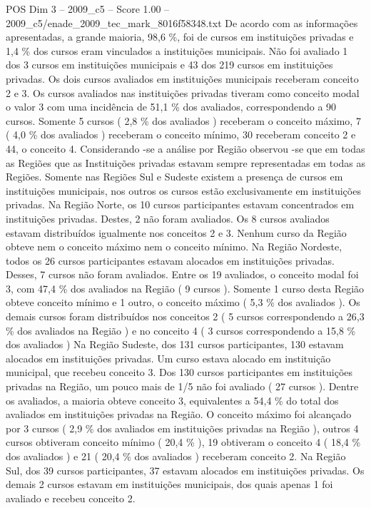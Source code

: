 \begin{textsample}{POS Dim 3 – 2009\_c5 – Score 1.00 – 2009\_c5/enade\_2009\_tec\_mark\_8016f58348.txt}
De acordo com as informações apresentadas, a grande maioria, 98,6 \%, foi de cursos em instituições privadas e 1,4 \% dos cursos eram vinculados a instituições municipais.
Não foi avaliado 1 dos 3 cursos em instituições municipais e 43 dos 219 cursos em instituições privadas.
Os dois cursos avaliados em instituições municipais receberam conceito 2 e 3.
Os cursos avaliados nas instituições privadas tiveram como conceito modal o valor 3 com uma incidência de 51,1 \% dos avaliados, correspondendo a 90 cursos.
Somente 5 cursos ( 2,8 \% dos avaliados ) receberam o conceito máximo, 7 ( 4,0 \% dos avaliados ) receberam o conceito mínimo, 30 receberam conceito 2 e 44, o conceito 4.
Considerando -se a análise por Região observou -se que em todas as Regiões que as Instituições privadas estavam sempre representadas em todas as Regiões.
Somente nas Regiões Sul e Sudeste existem a presença de cursos em instituições municipais, nos outros os cursos estão exclusivamente em instituições privadas.
Na Região Norte, os 10 cursos participantes estavam concentrados em instituições privadas.
Destes, 2 não foram avaliados.
Os 8 cursos avaliados estavam distribuídos igualmente nos conceitos 2 e 3.
Nenhum curso da Região obteve nem o conceito máximo nem o conceito mínimo.
Na Região Nordeste, todos os 26 cursos participantes estavam alocados em instituições privadas.
Desses, 7 cursos não foram avaliados.
Entre os 19 avaliados, o conceito modal foi 3, com 47,4 \% dos avaliados na Região ( 9 cursos ).
Somente 1 curso desta Região obteve conceito mínimo e 1 outro, o conceito máximo ( 5,3 \% dos avaliados ).
Os demais cursos foram distribuídos nos conceitos 2 ( 5 cursos correspondendo a 26,3 \% dos avaliados na Região ) e no conceito 4 ( 3 cursos correspondendo a 15,8 \% dos avaliados ) Na Região Sudeste, dos 131 cursos participantes, 130 estavam alocados em instituições privadas.
Um curso estava alocado em instituição municipal, que recebeu conceito 3.
Dos 130 cursos participantes em instituições privadas na Região, um pouco mais de 1/5 não foi avaliado ( 27 cursos ).
Dentre os avaliados, a maioria obteve conceito 3, equivalentes a 54,4 \% do total dos avaliados em instituições privadas na Região.
O conceito máximo foi alcançado por 3 cursos ( 2,9 \% dos avaliados em instituições privadas na Região ), outros 4 cursos obtiveram conceito mínimo ( 20,4 \% ), 19 obtiveram o conceito 4 ( 18,4 \% dos avaliados ) e 21 ( 20,4 \% dos avaliados ) receberam conceito 2.
Na Região Sul, dos 39 cursos participantes, 37 estavam alocados em instituições privadas.
Os demais 2 cursos estavam em instituições municipais, dos quais apenas 1 foi avaliado e recebeu conceito 2.

\end{textsample}
